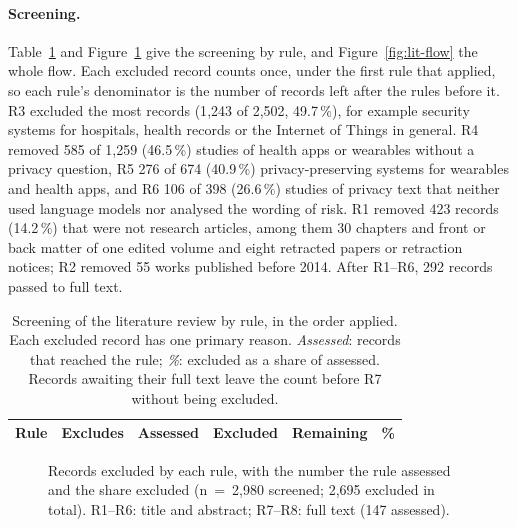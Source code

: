 \paragraph{Screening.} Table~\ref{tab:lit-screening} and
Figure~\ref{fig:lit-exclusions} give the screening by rule, and
Figure~\ref{fig:lit-flow} the whole flow. Each excluded record counts once,
under the first rule that applied, so each rule's denominator is the number of
records left after the rules before it. R3 excluded the most records (1{,}243
of 2{,}502, 49.7\,\%), for example security systems for hospitals, health
records or the Internet of Things in general. R4 removed 585 of 1{,}259 (46.5\,\%) studies of
health apps or wearables without a privacy question, R5 276 of 674 (40.9\,\%)
privacy-preserving systems for wearables and health apps, and R6 106 of 398
(26.6\,\%) studies of privacy text that neither used language models nor
analysed the wording of risk. R1 removed 423 records (14.2\,\%) that were not
research articles, among them 30 chapters and front or back matter of one
edited volume and eight retracted papers or retraction notices; R2 removed 55
works published before 2014. After R1--R6, 292 records passed to full text.

\begin{table}[tbp]
\centering
\begin{singlespace}
\caption[Screening of the literature review by rule]{Screening of the
literature review by rule, in the order applied. Each excluded record has one
primary reason. \emph{Assessed}: records that reached the rule; \emph{\%}:
excluded as a share of assessed. Records awaiting their full text leave the
count before R7 without being excluded.}
\label{tab:lit-screening}
\small
\begin{tabularx}{\textwidth}{@{}l>{\raggedright\arraybackslash}Xrrrr@{}}
\toprule
\textbf{Rule} & \textbf{Excludes} & \textbf{Assessed} & \textbf{Excluded} & \textbf{Remaining} & \textbf{\%} \\
\midrule
\end{tabularx}
\end{singlespace}
\end{table}

\begin{figure}[tbp]
\centering

\caption[Exclusions by rule]{Records excluded by each rule, with the number
the rule assessed and the share excluded (n~=~2{,}980 screened; 2{,}695
excluded in total). R1--R6: title and abstract; R7--R8: full text (147
assessed).}
\label{fig:lit-exclusions}
\end{figure}

